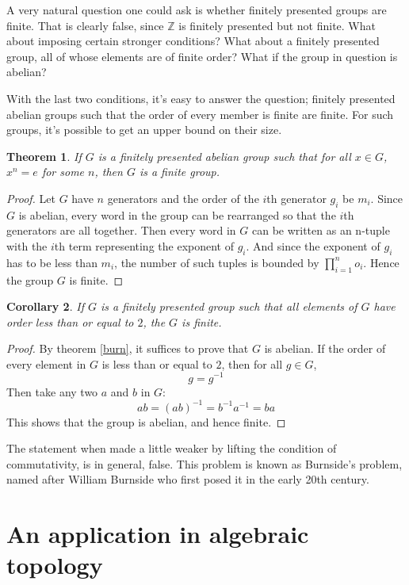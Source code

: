 \documentclass[12pt, titlepage]{article}
\newtheorem{thm}{Theorem}[section]
\newtheorem{cor}[thm]{Corollary}
\theoremstyle{definition}
\begin{document}
A very natural question one could ask is whether finitely presented groups are finite. That is clearly false, since $\mathbb{Z}$ is finitely presented but not finite. What about imposing certain stronger conditions? What about a finitely presented group, all of whose elements are of finite order? What if the group in question is abelian?\cite{baumslag}

With the last two conditions, it's easy to answer the question; finitely presented abelian groups such that the order of every member is finite are finite. For such groups, it's possible to get an upper bound on their size.

\begin{thm}\label{burn}
If $G$ is a finitely presented abelian group such that for all $x \in G$, $x^n=e$ for some $n$, then $G$ is a finite group.
\end{thm}

\begin{proof}
Let $G$ have $n$ generators and the order of the $i$th generator $g_i$ be $m_i$. Since $G$ is abelian, every word in the group can be rearranged so that the $i$th generators are all together. Then every word in $G$ can be written as an n-tuple with the $i$th term representing the exponent of $g_i$. And since the exponent of $g_i$ has to be less than $m_i$, the number of such tuples is bounded by $\prod_{i=1}^{n}o_i$. Hence the group $G$ is finite.
\end{proof}

\begin{cor}
If $G$ is a finitely presented group such that all elements of $G$ have order less than or equal to $2$, the $G$ is finite.
\end{cor}

\begin{proof}
By theorem \autoref{burn}, it suffices to prove that $G$ is abelian. If the order of every element in $G$ is less than or equal to $2$, then for all $g \in G$,
$$g=g^{-1}$$
Then take any two $a$ and $b$ in $G$:
$$ab = (ab)^{-1} = b^{-1}a^{-1} = ba$$
This shows that the group is abelian, and hence finite.
\end{proof}

The statement when made a little weaker by lifting the condition of commutativity, is in general, false. This problem is known as Burnside's problem, named after William Burnside who first posed it in the early 20th century.

\section{An application in algebraic topology}
\end{document}
